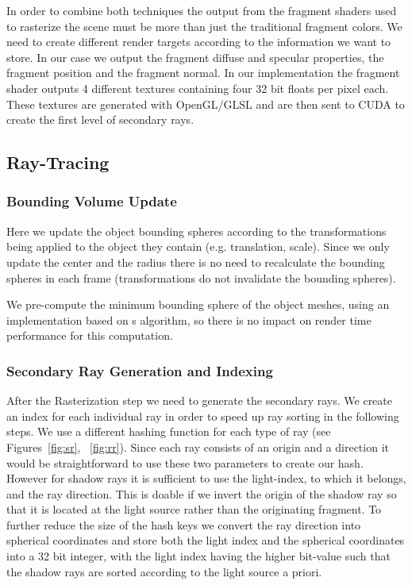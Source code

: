 \documentclass{egpubl}
\begin{document}
\medskip

In order to combine both techniques the output from the fragment shaders used to rasterize the scene must be more than just the traditional fragment colors. We need to create different render targets according to the information we want to store. In our case we output the fragment diffuse and specular properties, the fragment position and the fragment normal. In our implementation the fragment shader outputs 4 different textures containing four 32 bit floats per pixel each. These textures are generated with OpenGL/GLSL and are then sent to CUDA to create the first level of secondary rays.

\subsection{Ray-Tracing}

\subsubsection{Bounding Volume Update}
Here we update the object bounding spheres according to the transformations being applied to the object they contain (e.g. translation, scale). Since we only update the center and the radius there is no need to recalculate the bounding spheres in each frame (transformations do not invalidate the bounding spheres).

We pre-compute the minimum bounding sphere of the object meshes, using an implementation based on \cite{Gartner99}s algorithm, so there is no impact on render time performance for this computation.

\subsubsection{Secondary Ray Generation and Indexing}

After the Rasterization step we need to generate the secondary rays. We create an index for each individual ray in order to speed up ray sorting in the following steps. We use a different hashing function for each type of ray (see Figures~\ref{fig:sr}, ~\ref{fig:rr}). Since each ray consists of an origin and a direction it would be straightforward to use these two parameters to create our hash. However for shadow rays it is sufficient to use the light-index, to which it belongs, and the ray direction. This is doable if we invert the origin of the shadow ray so that it is located at the light source rather than the originating fragment. To further reduce the size of the hash keys we convert the ray direction into spherical coordinates \cite{GraphicGems5} and store both the light index and the spherical coordinates into a 32 bit integer, with the light index having the higher bit-value such that the shadow rays are sorted according to the light source a priori.
\end{document}
